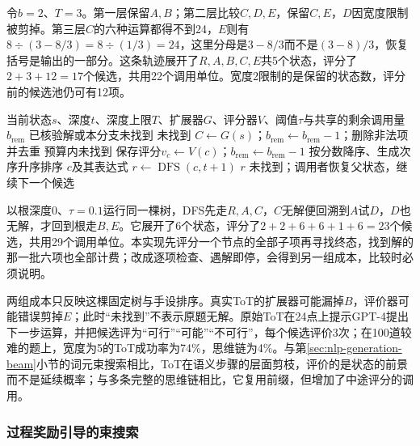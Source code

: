 令$b=2$、$T=3$。第一层保留$A,B$；第二层比较$C,D,E$，保留$C,E$，$D$因宽度限制被剪掉。第三层$C$的六种运算都得不到24，$E$则有$8\div(3-8/3)=8\div(1/3)=24$，这里分母是$3-8/3$而不是$(3-8)/3$，恢复括号是输出的一部分。这条轨迹展开了$R,A,B,C,E$共5个状态，评分了$2+3+12=17$个候选，共用22个调用单位。宽度2限制的是保留的状态数，评分前的候选池仍可有12项。

\begingroup
{}
\begin{algorithm}[带回溯的ToT深度优先搜索]
\label{alg:nlp-execution-tot-dfs}
\begin{algorithmic}[1]
\Require 当前状态$s$、深度$t$、深度上限$T$、扩展器$G$、评分器$V$、阈值$\tau$与共享的剩余调用量$b_{\mathrm{rem}}$
\Ensure 已核验解或本分支未找到
 \State \Return 未找到 \EndIf
\State $C\gets G(s)$；$b_{\mathrm{rem}}\gets b_{\mathrm{rem}}-1$；删除非法项并去重
   \State \Return 预算内未找到 \EndIf
  \State 保存评分$v_c\gets V(c)$；$b_{\mathrm{rem}}\gets b_{\mathrm{rem}}-1$
\EndFor
\State 按分数降序、生成次序升序排序
    \State \Return $c$及其表达式
    \State $r\gets\operatorname{DFS}(c,t+1)$
     \State \Return $r$ \EndIf
  \EndIf
\EndFor
\State \Return 未找到；调用者恢复父状态，继续下一个候选
\end{algorithmic}
\end{algorithm}
\endgroup

以根深度0、$\tau=0.1$运行同一棵树，DFS先走$R,A,C$，$C$无解便回溯到$A$试$D$，$D$也无解，才回到根走$B,E$。它展开了6个状态，评分了$2+2+6+6+1+6=23$个候选，共用29个调用单位。本实现先评分一个节点的全部子项再寻找终态，找到解的那一批六项也全部计费；改成逐项检查、遇解即停，会得到另一组成本，比较时必须说明。

两组成本只反映这棵固定树与手设排序。真实ToT的扩展器可能漏掉$B$，评价器可能错误剪掉$E$；此时“未找到”不表示原题无解。原始ToT在24点上提示GPT-4提出下一步运算，并把候选评为“可行”“可能”“不可行”，每个候选评价3次；在100道较难的题上，宽度为5的ToT成功率为74\%，思维链为4\%。与第\ref{sec:nlp-generation-beam}小节的词元束搜索相比，ToT在语义步骤的层面剪枝，评价的是状态的前景而不是延续概率；与多条完整的思维链相比，它复用前缀，但增加了中途评分的调用。

\subsubsection{过程奖励引导的束搜索}
\label{sec:nlp-reasoning-prm-beam}

